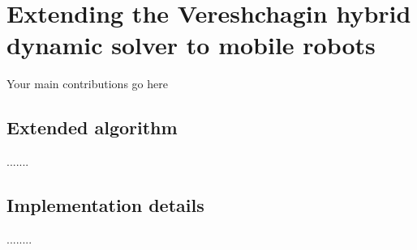 
\chapter{Extending the Vereshchagin hybrid dynamic solver to mobile robots}



Your main contributions go here

\section{Extended algorithm}{.......}


\section{Implementation details}{........}
